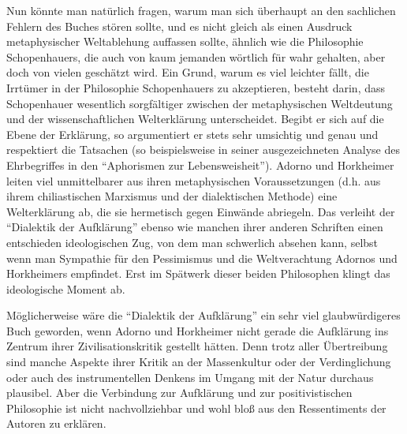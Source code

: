 \documentclass[12pt,a4paper,ngerman]{article}
\begin{document}
Nun könnte man natürlich fragen, warum man sich überhaupt an den
sachlichen Fehlern des Buches stören sollte, und es nicht gleich als
einen Ausdruck metaphysischer Weltablehung auffassen sollte, ähnlich
wie die Philosophie Schopenhauers, die auch von kaum jemanden wörtlich
für wahr gehalten, aber doch von vielen geschätzt wird. Ein Grund,
warum es viel leichter fällt, die Irrtümer in der Philosophie
Schopenhauers zu akzeptieren, besteht darin, dass Schopenhauer
wesentlich sorgfältiger zwischen der metaphysischen Weltdeutung und
der wissenschaftlichen Welterklärung unterscheidet. Begibt er sich auf
die Ebene der Erklärung, so argumentiert er stets sehr umsichtig und
genau und respektiert die Tatsachen (so beispielsweise in seiner
ausgezeichneten Analyse des Ehrbegriffes in den "`Aphorismen zur
Lebensweisheit"'). Adorno und Horkheimer leiten viel unmittelbarer aus
ihren metaphysischen Voraussetzungen (d.h. aus ihrem chiliastischen
Marxismus und der dialektischen Methode) eine Welterklärung ab, die
sie hermetisch gegen Einwände abriegeln. Das verleiht der "`Dialektik
der Aufklärung"' ebenso wie manchen ihrer anderen Schriften einen
entschieden ideologischen Zug, von dem man schwerlich absehen kann,
selbst wenn man Sympathie für den Pessimismus und die Weltverachtung
Adornos und Horkheimers empfindet. Erst im Spätwerk dieser beiden
Philosophen klingt das ideologische Moment ab.

Möglicherweise wäre die "`Dialektik der Aufklärung"' ein sehr viel
glaubwürdigeres Buch geworden, wenn Adorno und Horkheimer nicht gerade die
Aufklärung ins Zentrum ihrer Zivilisationskritik gestellt hätten. Denn trotz
aller Übertreibung sind manche Aspekte ihrer Kritik an der Massenkultur oder
der Verdinglichung oder auch des instrumentellen Denkens im Umgang mit der
Natur durchaus plausibel. Aber die Verbindung zur Aufklärung und zur
positivistischen Philosophie ist nicht nachvollziehbar und wohl bloß aus den
Ressentiments der Autoren zu erklären.
\end{document}
